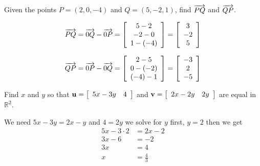 \begin{enumialphparenastyle}

\begin{ex} Given the points $P=(2,0,-4)$ and $Q=(5,-2,1)$, find $\overrightarrow{PQ}$ and $\overrightarrow{QP}$.
 
\begin{sol}

\begin{equation*}
\overrightarrow{PQ}  = \overrightarrow{0Q} - \overrightarrow{0P}= \left[ \begin{array}{c}
5-2\\
 -2-0 \\
1-(-4)
\end{array}
\right] = \left[ \begin{array}{c}
3\\
 -2 \\
5
\end{array}
\right]
\end{equation*}

\begin{equation*}
\overrightarrow{QP}  = \overrightarrow{0P} - \overrightarrow{0Q}= \left[ \begin{array}{c}
2-5\\
 0-(-2) \\
(-4)-1
\end{array}
\right] = \left[ \begin{array}{c}
-3\\
 2 \\
-5
\end{array}
\right]
\end{equation*}

\end{sol}
\end{ex}

\begin{ex} Find $x$ and $y$ so that ${\bf u}= \left[ \begin{array}{cc}
5x-3y & 4
\end{array}
\right]$ and ${\bf v}= \left[ \begin{array}{cc}
2x-2y & 2y
\end{array}
\right]$ are equal in $\mathbb{R}^2$.
 
\begin{sol}

We need $5x-3y=2x-y$ and $4=2y$ we solve for $y$ first, $y=2$ then we get 
\begin{align*}
5x-3\cdot 2&=2x-2\\
3x-6&=-2\\
3x&=4\\
x&=\frac{4}{3}
\end{align*}



\end{sol}
\end{ex}
\end{enumialphparenastyle}
